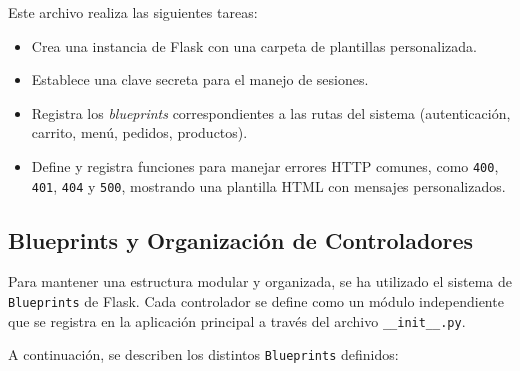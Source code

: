 \documentclass[10pt]{book}
\begin{document}
    Este archivo realiza las siguientes tareas:
    
    \begin{itemize}
      \item Crea una instancia de Flask con una carpeta de plantillas personalizada.
      \item Establece una clave secreta para el manejo de sesiones.
      \item Registra los \textit{blueprints} correspondientes a las rutas del sistema (autenticación, carrito, menú, pedidos, productos).
      \item Define y registra funciones para manejar errores HTTP comunes, como \texttt{400}, \texttt{401}, \texttt{404} y \texttt{500}, mostrando una plantilla HTML con mensajes personalizados.
    \end{itemize}
\subsection{Blueprints y Organización de Controladores}

Para mantener una estructura modular y organizada, se ha utilizado el sistema de \texttt{Blueprints} de Flask. Cada controlador se define como un módulo independiente que se registra en la aplicación principal a través del archivo \texttt{\_\_init\_\_.py}.

A continuación, se describen los distintos \texttt{Blueprints} definidos:
\end{document}
